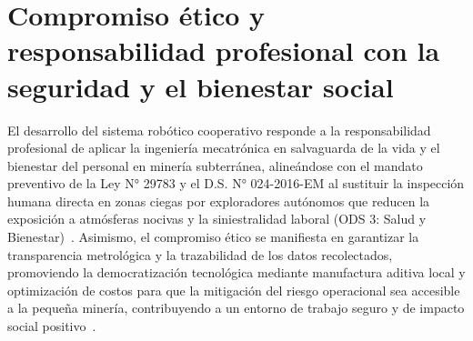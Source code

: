 \section{Compromiso ético y responsabilidad profesional con la seguridad y el bienestar social}
\hspace{1.25cm}
El desarrollo del sistema robótico cooperativo responde a la responsabilidad profesional de aplicar la ingeniería mecatrónica en salvaguarda de la vida y el bienestar del personal en minería subterránea, alineándose con el mandato preventivo de la Ley N° 29783 y el D.S. N° 024-2016-EM al sustituir la inspección humana directa en zonas ciegas por exploradores autónomos que reducen la exposición a atmósferas nocivas y la siniestralidad laboral (ODS 3: Salud y Bienestar)~\cite{MINEM_DS024_2016}. Asimismo, el compromiso ético se manifiesta en garantizar la transparencia metrológica y la trazabilidad de los datos recolectados, promoviendo la democratización tecnológica mediante manufactura aditiva local y optimización de costos para que la mitigación del riesgo operacional sea accesible a la pequeña minería, contribuyendo a un entorno de trabajo seguro y de impacto social positivo~\cite{OSINERGMIN_BoletinGSM_2020}.
